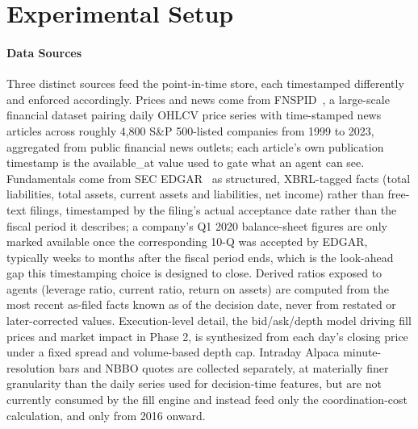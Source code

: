 \documentclass{article}
\begin{document}
\section{Experimental Setup}

\paragraph{Data Sources} Three distinct sources feed the point-in-time store, each timestamped differently and enforced accordingly. Prices and news come from FNSPID~\cite{dong2024fnspid}, a large-scale financial dataset pairing daily OHLCV price series with time-stamped news articles across roughly 4,800 S\&P 500-listed companies from 1999 to 2023, aggregated from public financial news outlets; each article's own publication timestamp is the available\_at value used to gate what an agent can see. Fundamentals come from SEC EDGAR~\cite{secedgar} as structured, XBRL-tagged facts (total liabilities, total assets, current assets and liabilities, net income) rather than free-text filings, timestamped by the filing's actual acceptance date rather than the fiscal period it describes; a company's Q1 2020 balance-sheet figures are only marked available once the corresponding 10-Q was accepted by EDGAR, typically weeks to months after the fiscal period ends, which is the look-ahead gap this timestamping choice is designed to close. Derived ratios exposed to agents (leverage ratio, current ratio, return on assets) are computed from the most recent as-filed facts known as of the decision date, never from restated or later-corrected values. Execution-level detail, the bid/ask/depth model driving fill prices and market impact in Phase 2, is synthesized from each day's closing price under a fixed spread and volume-based depth cap. Intraday Alpaca minute-resolution bars and NBBO quotes are collected separately, at materially finer granularity than the daily series used for decision-time features, but are not currently consumed by the fill engine and instead feed only the coordination-cost calculation, and only from 2016 onward.
\end{document}
